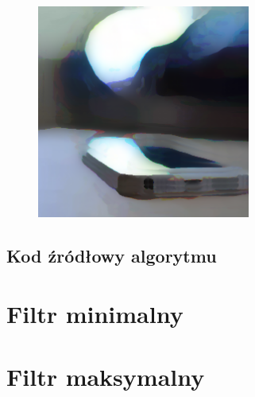 \documentclass[a4paper,12pt]{book}
\begin{document}
\begin{figure}[H]
			\includegraphics[width=7cm, height=7cm]{phone-filter-kuwahara-color27x27.png}
		\end{figure}
		\subsection{Kod źródłowy algorytmu}
	\section{Filtr minimalny}
	\section{Filtr maksymalny}
\end{document}
